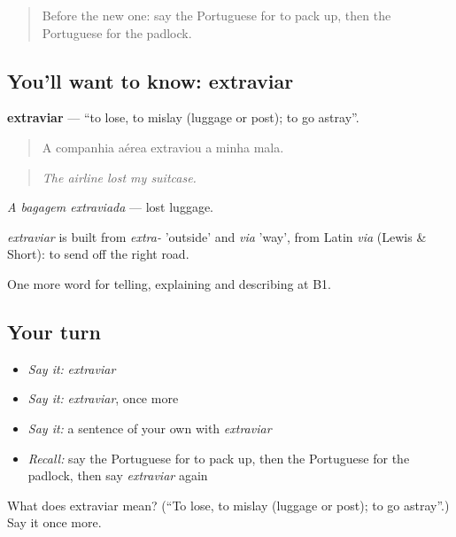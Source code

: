 \label{lesson:PT-C422-extraviar}



\begin{quote}
Before the new one: say the Portuguese for to pack up, then the Portuguese for the padlock.
\end{quote}

\subsection*{You'll want to know: extraviar}
\textbf{extraviar} — \textquotedblleft{}to lose, to mislay (luggage or post); to go astray\textquotedblright{}.

\begin{quote}
A companhia aérea extraviou a minha mala.
\end{quote}

\begin{quote}
\emph{The airline lost my suitcase.}
\end{quote}

\emph{A bagagem extraviada} — lost luggage.

\begin{cousinweb}
\emph{extraviar} is built from \emph{extra-} 'outside' and \emph{via} 'way', from Latin \emph{via} (Lewis \& Short): to send off the right road.
\end{cousinweb}

\begin{grammarlens}[title={What you've built}]
One more word for telling, explaining and describing at B1.
\end{grammarlens}

\subsection*{Your turn}
\begin{itemize}
\raggedright
  \item \emph{Say it:} \emph{extraviar}
  \item \emph{Say it:} \emph{extraviar}, once more
  \item \emph{Say it:} a sentence of your own with \emph{extraviar}
  \item \emph{Recall:} say the Portuguese for to pack up, then the Portuguese for the padlock, then say \emph{extraviar} again
\end{itemize}

\begin{tcolorbox}[breakable,colback=teal!4,colframe=teal!35!black,title={Before you move on}]
What does extraviar mean? (\textquotedblleft{}To lose, to mislay (luggage or post); to go astray\textquotedblright{}.) Say it once more.
\end{tcolorbox}

